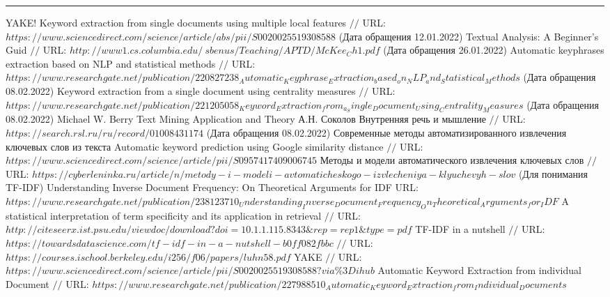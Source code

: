\makeatletter \renewcommand{} \makeatother
\renewcommand\refname{Список использованных источников}
\begin{thebibliography}{00}
	\hrule	
	
	YAKE! Keyword extraction from single documents using multiple local features $//$ URL: $https://www.sciencedirect.com/science/article/abs/pii/S0020025519308588$ (Дата обращения 12.01.2022)
	Textual Analysis: A Beginner's Guid  $//$ URL: $http://www1.cs.columbia.edu/~sbenus/Teaching/APTD/McKee_Ch1.pdf$ (Дата обращения 26.01.2022)
	Automatic keyphrases extraction based on NLP  and statistical methods $//$ URL: $https://www.researchgate.net/publication/220827238_Automatic_Keyphrase_Extraction_based_on_NLP_and_Statistical_Methods$ (Дата обращения 08.02.2022)
	Keyword extraction from a single document using centrality measures $//$ URL: $https://www.researchgate.net/publication/221205058_Keyword_Extraction_from_a_Single_Document_Using_Centrality_Measures$ (Дата обращения 08.02.2022)
	Michael W. Berry Text Mining Application and Theory
	А.Н. Соколов Внутренняя речь и мышление $//$ URL: $https://search.rsl.ru/ru/record/01008431174$ (Дата обращения 08.02.2022)
	Современные методы автоматизированного извлечения ключевых слов из текста
	Automatic keyword prediction using Google similarity distance $//$ URL: $https://www.sciencedirect.com/science/article/pii/S0957417409006745$
	Методы и модели автоматического извлечения ключевых слов $//$ URL: $https://cyberleninka.ru/article/n/metody-i-modeli-avtomaticheskogo-izvlecheniya-klyuchevyh-slov$
	(Для понимания TF-IDF) Understanding Inverse Document Frequency: On Theoretical Arguments for IDF URL: $https://www.researchgate.net/publication/238123710_Understanding_Inverse_Document_Frequency_On_Theoretical_Arguments_for_IDF$
	A statistical interpretation of term specificity and its application in retrieval $//$ URL: $http://citeseerx.ist.psu.edu/viewdoc/download?doi=10.1.1.115.8343\&rep=rep1\&type=pdf$
	TF-IDF in a nutshell $//$ URL: $https://towardsdatascience.com/tf-idf-in-a-nutshell-b0ff082fbbc$
	 $//$ URL: $https://courses.ischool.berkeley.edu/i256/f06/papers/luhn58.pdf$
	YAKE $//$ URL: $https://www.sciencedirect.com/science/article/pii/S0020025519308588?via\%3Dihub$
	Automatic Keyword Extraction from individual Document
	$//$ URL: $https://www.researchgate.net/publication/227988510_Automatic_Keyword_Extraction_from_Individual_Documents$
\end{thebibliography}
